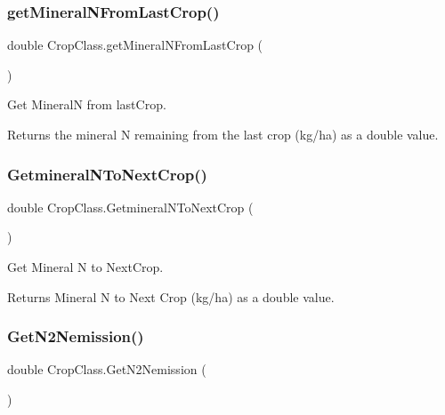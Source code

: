\subsubsection{\texorpdfstring{getMineralNFromLastCrop()}{getMineralNFromLastCrop()}}
{\footnotesize\ttfamily double Crop\+Class.\+get\+Mineral\+N\+From\+Last\+Crop (\begin{DoxyParamCaption}{ }\end{DoxyParamCaption})\hspace{0.3cm}{\ttfamily [inline]}}



Get MineralN from last\+Crop. 

\begin{DoxyReturn}{Returns}
the mineral N remaining from the last crop (kg/ha) as a double value. 
\end{DoxyReturn}
\mbox{\label{class_crop_class_a52a59935e6b699010f0fa503b8d2237d}} 
\subsubsection{\texorpdfstring{GetmineralNToNextCrop()}{GetmineralNToNextCrop()}}
{\footnotesize\ttfamily double Crop\+Class.\+Getmineral\+N\+To\+Next\+Crop (\begin{DoxyParamCaption}{ }\end{DoxyParamCaption})\hspace{0.3cm}{\ttfamily [inline]}}



Get Mineral N to Next\+Crop. 

\begin{DoxyReturn}{Returns}
Mineral N to Next Crop (kg/ha) as a double value. 
\end{DoxyReturn}
\mbox{\label{class_crop_class_a81108483d7d4f5e48405a58e07618c14}} 
\subsubsection{\texorpdfstring{GetN2Nemission()}{GetN2Nemission()}}
{\footnotesize\ttfamily double Crop\+Class.\+Get\+N2\+Nemission (\begin{DoxyParamCaption}{ }\end{DoxyParamCaption})\hspace{0.3cm}{\ttfamily [inline]}}




